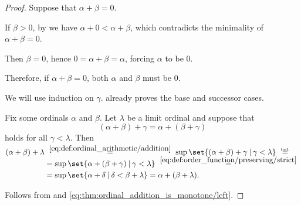 \begin{proof}
   Suppose that \( \alpha + \beta = 0 \).

  If \( \beta > 0 \), by  we have \( \alpha + 0 < \alpha + \beta \), which contradicts the minimality of \( \alpha + \beta = 0 \).

  Then \( \beta = 0 \), hence \( 0 = \alpha + \beta = \alpha \), forcing \( \alpha \) to be \( 0 \).

  Therefore, if \( \alpha + \beta = 0 \), both \( \alpha \) and \( \beta \) must be \( 0 \).

   We will use induction on \( \gamma \).  already proves the base and successor cases.

  Fix some ordinals \( \alpha \) and \( \beta \). Let \( \lambda \) be a limit ordinal and suppose that
  \begin{equation*}
    (\alpha + \beta) + \gamma = \alpha + (\beta + \gamma)
  \end{equation*}
  holds for all \( \gamma < \lambda \). Then
  \begin{align*}
    (\alpha + \beta) + \lambda
    &\reloset {\eqref{eq:def:ordinal_arithmetic/addition}} =
    \sup\set{ (\alpha + \beta) + \gamma \given \gamma < \lambda }
    \reloset {\T{ind.}} = \\ &=
    \sup\set{ \alpha + (\beta + \gamma) \given \gamma < \lambda }
    \reloset {\eqref{eq:def:order_function/preserving/strict}} = \\ &=
    \sup\set{ \alpha + \delta \given \delta < \beta + \lambda }
    =
    \alpha + (\beta + \lambda).
  \end{align*}

   Follows from  and \eqref{eq:thm:ordinal_addition_is_monotone/left}.
\end{proof}


